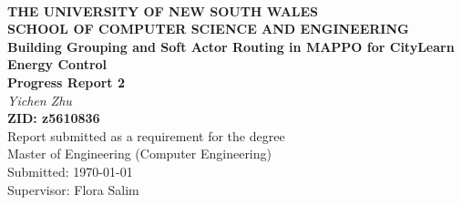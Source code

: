 \begin{center} ~
\vspace*{2cm} \\
\textbf{\large THE UNIVERSITY OF NEW SOUTH WALES} \\[1ex]
\textbf{\large SCHOOL OF COMPUTER SCIENCE AND ENGINEERING} \\[3cm]
\textbf{\Huge Building Grouping and Soft Actor Routing in MAPPO for CityLearn Energy Control} \\[1.5cm]
\textbf{\Large Progress Report 2} \\[1.5cm]
\textit{\huge Yichen Zhu} \\[1cm]
\textbf{\Large ZID: z5610836} \\[1.5cm]
{\Large
Report submitted as a requirement for the degree\\
Master of Engineering (Computer Engineering) \\[2ex]
Submitted: \today \\[2ex]
Supervisor: Flora Salim
}
\end{center}
